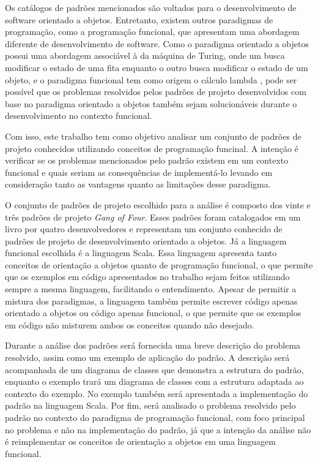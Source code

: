 
Os catálogos de padrões mencionados são 
voltados para o desenvolvimento de software 
orientado a objetos.\cite{gamma:1995} Entretanto, existem 
outros paradigmas de programação, como 
a programação funcional, que apresentam 
uma abordagem diferente de desenvolvimento 
de software.
Como o paradigma orientado a objetos possui uma 
abordagem associável à da máquina de Turing, onde um 
busca modificar o estado de uma fita enquanto o outro 
busca modificar o estado de um objeto, e o paradigma 
funcional tem como origem o cálculo lambda
\cite{michaelson:2011}, pode ser possível que os problemas 
resolvidos pelos padrões de projeto desenvolvidos 
com base no paradigma orientado a objetos também 
sejam solucionáveis durante o desenvolvimento 
no contexto funcional. 


Com isso, este trabalho tem como objetivo 
analisar um conjunto de padrões de projeto 
conhecidos utilizando conceitos de programação 
funcinal. A intenção é verificar se os 
problemas mencionados pelo padrão existem 
em um contexto funcional e quais 
seriam as consequências de implementá-lo 
levando em consideração tanto as vantagens 
quanto as limitações desse paradigma.


O conjunto de padrões de projeto escolhido 
para a análise é composto dos vinte e três 
padrões de projeto \textit{Gang of Four}. 
Esses padrões foram catalogados em um livro 
por quatro desenvolvedores e representam 
um conjunto conhecido de padrões de projeto 
de desenvolvimento orientado a objetos. \cite{gamma:1995}
Já a linguagem funcional escolhida é a 
linguagem Scala. Essa linguagem 
apresenta tanto conceitos de orientação 
a objetos quanto de programação funcional, 
o que permite que os exemplos em código 
apresentados no trabalho sejam feitos 
utilizando sempre a mesma linguagem, 
facilitando o entendimento.\cite{wampler2021}
Apesar de permitir a mistura dos 
paradigmas, a linguagem também permite  
escrever código apenas orientado a 
objetos ou código apenas funcional, 
o que permite que os exemplos em 
código não misturem ambos os conceitos 
quando não desejado.


Durante a análise dos padrões será 
fornecida uma breve descrição do problema 
resolvido, assim como um exemplo de aplicação 
do padrão. A descrição será acompanhada de 
um diagrama de classes que demonstra a 
estrutura do padrão, enquanto o exemplo 
trará um diagrama de classes com a estrutura 
adaptada ao contexto do exemplo. No exemplo 
também será apresentada a implementação 
do padrão na linguagem Scala. Por fim, será 
analisado o problema resolvido pelo padrão 
no contexto do paradigma de programação 
funcional, com foco principal no problema 
e não na implementação do padrão, já que 
a intenção da análise não é reimplementar os 
conceitos de orientação a objetos em uma 
linguagem funcional. 

